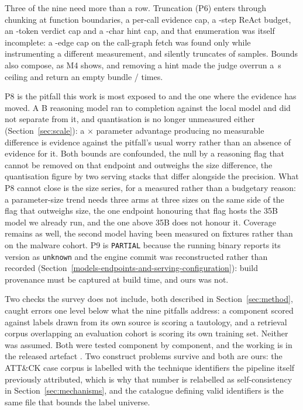 Three of the nine need more than a row. Truncation (P6) enters through chunking at function
boundaries, a per-call evidence cap, a -step ReAct budget, an
-token verdict cap and a -char hint cap, and that enumeration
was itself incomplete: a -edge cap on the call-graph fetch was found only while
instrumenting a different measurement, and silently truncates  of
 samples. Bounds also compose, as M4 shows, and removing a hint made the judge
overrun a \,s ceiling and return an empty bundle
/ times.

P8 is the pitfall this work is most exposed to and the one where the evidence has moved. A
B reasoning model ran to completion against the local model and did not
separate from it, and quantisation is no longer unmeasured either (Section~\ref{sec:scale}): a
$\times$ parameter advantage producing no measurable difference is evidence
against the pitfall's usual worry rather than an absence of evidence for it. Both bounds are
confounded, the null by a reasoning flag that cannot be removed on that endpoint and outweighs the
size difference, the quantisation figure by two serving stacks that differ alongside the precision.
What P8 cannot close is the size series, for a measured rather than a budgetary reason: a
parameter-size trend needs three arms at three sizes on the same side of the flag that outweighs
size, the one endpoint honouring that flag hosts the 35B model we already run, and the one above 35B
does not honour it. Coverage remains as well, the second model having been measured on fixtures
rather than on the malware cohort. P9 is \texttt{PARTIAL} because the running binary reports its
version as \texttt{unknown} and the engine commit was reconstructed rather than recorded
(Section~\ref{models-endpoints-and-serving-configuration}): build provenance must be captured at
build time, and ours was not.

Two checks the survey does not include, both described in Section~\ref{sec:method}, caught errors
one level below what the nine pitfalls address: a component scored against labels drawn from its own
source is scoring a tautology, and a retrieval corpus overlapping an evaluation cohort is scoring
its own training set. Neither was assumed. Both were tested component by component, and the working
is in the released artefact \citep{release2026artefact}. Two construct problems survive and both
are ours: the ATT\&CK case corpus is labelled with the technique identifiers the pipeline itself
previously attributed, which is why that number is relabelled as self-consistency in
Section~\ref{sec:mechanisms}, and the catalogue defining valid identifiers is the same file that
bounds the label universe.

